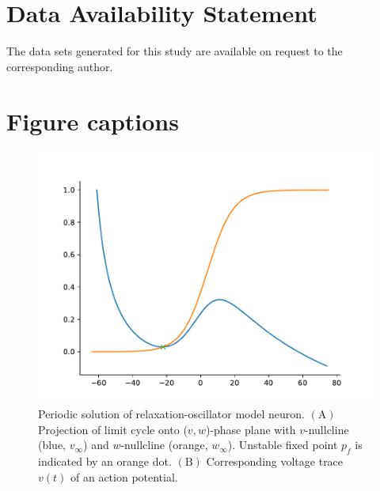 \documentclass[utf8]{frontiersFPHY} %
\begin{document}
\section*{Data Availability Statement}
The data sets generated for this study are available on request to the corresponding author.



\section*{Figure captions}

\begin{figure}[h!]
  \centering
  \includegraphics{nullclines}
  \caption{Periodic solution of relaxation-oscillator model neuron. $\bm{\mathrm{(A)}}$
    Projection of limit cycle onto ($v,w$)-phase plane with $v$-nullcline (blue,
    $v_\infty$) and $w$-nullcline (orange, $w_\infty$). Unstable fixed point $p_{f}$
    is indicated by an orange dot. $\bm{\mathrm{(B)}}$ Corresponding voltage trace
    $v(t)$ of an action potential.~\label{fig:nullclines}}
\end{figure}
\end{document}
